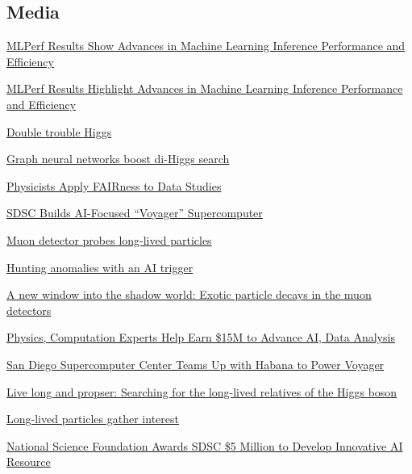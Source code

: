 \documentclass{res}
\newcommand{\MarginText}[1]{\section{#1}\vspace{10pt}}
\begin{document}
\begin{resume}
  \MarginText{Media}

  \href{https://mlcommons.org/en/news/mlperf-inference-1q2022/}{MLPerf Results Show Advances in Machine Learning Inference Performance and Efficiency}

  \href{https://insidehpc.com/2022/04/mlperf-results-highlight-advances-in-machine-learning-inference-performance-and-efficiency/}{MLPerf Results Highlight Advances in Machine Learning Inference Performance and Efficiency}

  \href{https://www.symmetrymagazine.org/article/double-trouble-higgs}{Double trouble Higgs}

  \href{https://cerncourier.com/a/graph-neural-networks-boost-di-higgs-search/}{Graph neural networks boost di-Higgs search}

  \href{https://ucsdnews.ucsd.edu/pressrelease/physicists-apply-fairness-to-data-studies}{Physicists Apply FAIRness to Data Studies}

  \href{https://www.intel.com/content/www/us/en/customer-spotlight/stories/san-diego-supercomputer-customer-story.html}{SDSC Builds AI-Focused ``Voyager'' Supercomputer}

  \href{https://cerncourier.com/a/muon-detector-probes-long-lived-particles/}{Muon detector probes long-lived particles}

  \href{https://cerncourier.com/a/hunting-anomalies-with-an-ai-trigger/}{Hunting anomalies with an AI trigger}

  \href{https://cms.cern/news/new-window-shadow-world-exotic-particle-decays-muon-detectors}{A new window into the shadow world: Exotic particle decays in the muon detectors}

  \href{https://ucsdnews.ucsd.edu/pressrelease/physics-computation-experts-help-earn-15m-to-advance-ai-data-analysis}{Physics, Computation Experts Help Earn \$15M to Advance AI, Data Analysis}

  \href{https://ucsdnews.ucsd.edu/pressrelease/san-diego-supercomputer-center-teams-up-with-habana-to-power-voyager}{San Diego Supercomputer Center Teams Up with Habana to Power Voyager}

  \href{https://cms.cern/news/live-long-and-prosper-searching-long-lived-relatives-higgs-boson}{Live long and propser: Searching for the long-lived relatives of the Higgs boson}

  \href{https://cerncourier.com/a/long-lived-particles-gather-interest/}{Long-lived particles gather interest}

  \href{https://ucsdnews.ucsd.edu/pressrelease/national-science-foundation-awards-sdsc-5-million-to-develop-innovative-ai-resource}{National Science Foundation Awards SDSC \$5 Million to Develop Innovative AI Resource}


\end{resume}
\end{document}
